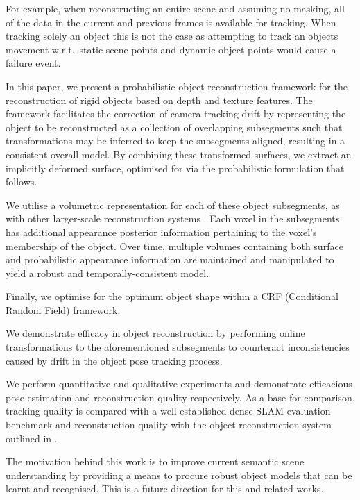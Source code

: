 For example, when reconstructing an entire scene and assuming no masking, all of the data in the current and previous frames is available for tracking. When tracking solely an object this is not the case as attempting to track an objects movement w.r.t.\ static scene points and dynamic object points would cause a failure event.

In this paper, we present a probabilistic object reconstruction framework for the reconstruction of rigid objects based on 
depth and texture features. The framework facilitates the correction of camera tracking drift by representing the object to be reconstructed as a
collection of overlapping subsegments such that transformations may be inferred to keep the subsegments aligned, resulting in a consistent
overall model. By combining these transformed surfaces, we extract an implicitly deformed surface, optimised for via the probabilistic formulation 
that follows.

We utilise a volumetric representation for each of these object subsegments, as with other larger-scale reconstruction
systems \cite{Kahler2016}. Each voxel in the subsegments has additional appearance posterior information pertaining to the voxel's membership 
of the object. Over time, multiple volumes containing both surface and probabilistic appearance information are maintained and manipulated to 
yield a robust and temporally-consistent model.

Finally, we optimise for the optimum object shape within a CRF (Conditional Random Field) framework.

We demonstrate efficacy in object reconstruction by performing online transformations to the aforementioned subsegments to counteract inconsistencies caused by drift in the object pose tracking process.

We perform quantitative and qualitative experiments and demonstrate efficacious pose estimation and reconstruction quality respectively. As a base 
for comparison, tracking quality is compared with a well established dense SLAM evaluation benchmark \cite{sturm12iros} and reconstruction quality 
with the object reconstruction system outlined in \cite{Ren2013}.

The motivation behind this work is to improve current semantic scene understanding\cite{Valentin2015, Golodetz2015} by providing a means to procure 
robust object models that can be learnt and recognised. This is a future direction for this and related works.